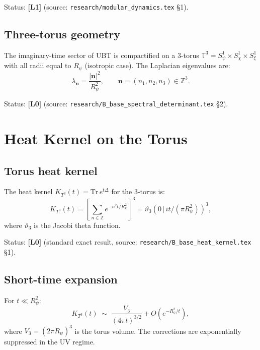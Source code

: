 \documentclass[11pt,a4paper]{article}
\newcommand{\Lzero}{\textbf{[L0]}}
\newcommand{\Lone}{\textbf{[L1]}}
\begin{document}
Status: \Lone{} (source: \texttt{research/modular\_dynamics.tex} §1).

\subsection{Three-torus geometry}

The imaginary-time sector of UBT is compactified on a 3-torus
$\mathbb{T}^3 = S^1_\psi\times S^1_\chi\times S^1_\xi$ with all radii equal
to $R_\psi$ (isotropic case).  The Laplacian eigenvalues are:
\begin{equation}
\label{eq:eigenvalues}
  \lambda_{\mathbf{n}} = \frac{|\mathbf{n}|^2}{R_\psi^2},
  \qquad
  \mathbf{n}=(n_1,n_2,n_3)\in\mathbb{Z}^3.
\end{equation}

Status: \Lzero{} (source: \texttt{research/B\_base\_spectral\_determinant.tex} §2).

\section{Heat Kernel on the Torus}
\label{sec:heat_kernel}

\subsection{Torus heat kernel}

The heat kernel $K_{T^3}(t) = \mathrm{Tr}\,e^{t\Delta}$ for the 3-torus is:
\begin{equation}
\label{eq:hk_torus}
  K_{T^3}(t)
  = \left[\sum_{n\in\mathbb{Z}} e^{-n^2 t/R_\psi^2}\right]^3
  = \vartheta_3(0\,|\, it/(\pi R_\psi^2))^3,
\end{equation}
where $\vartheta_3$ is the Jacobi theta function.

Status: \Lzero{} (standard exact result, source:
\texttt{research/B\_base\_heat\_kernel.tex} §1).

\subsection{Short-time expansion}

For $t \ll R_\psi^2$:
\begin{equation}
\label{eq:hk_expand}
  K_{T^3}(t) \;\sim\;
  \frac{V_3}{(4\pi t)^{3/2}}
  + O(e^{-R_\psi^2/t}),
\end{equation}
where $V_3=(2\pi R_\psi)^3$ is the torus volume.
The corrections are exponentially suppressed in the UV regime.
\end{document}
